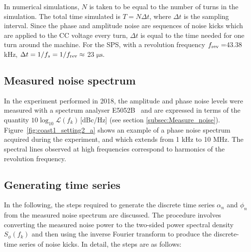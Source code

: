 In numerical simulations, $N$ is taken to be equal to the number of turns in the simulation. The total time simulated is $T=N \Delta t$, where $\Delta t$ is the sampling interval. Since the phase and amplitude noise are sequences of noise kicks which are applied to the CC voltage every turn, $\Delta t$ is equal to the time needed for one turn around the machine. For the SPS, with a revolution frequency ${f_\mathrm{rev}} = $43.38 kHz, $\Delta t=1/f_s = 1/{f_\mathrm{rev}} \approx$ 23 $\mathrm{\mu s}$. 
\subsection{Measured noise spectrum}
In the experiment performed in 2018, the amplitude and phase noise levels were measured with a spectrum analyser E5052B~\cite{E5052B_insight} and are expressed in terms of the quantity $10\log_{10}\mathcal{L}(f_k)$\,[dBc/Hz] (see section \ref{subsec:Measure_noise}). Figure~\ref{fig:coast1_setting2_a} shows an example of a phase noise spectrum acquired during the experiment, and which extends from 1 kHz to 10 MHz. The spectral lines observed at high frequencies correspond to harmonics of the revolution frequency. 

\subsection{Generating time series}\label{subsec:generatin_noise_kicks}
In the following, the steps required to generate the discrete time series $\alpha_n$ and $\phi_n$ from the measured noise spectrum are discussed. The procedure involves converting the measured noise power to the two-sided power spectral density $S_\phi(f_k)$ and then using the inverse Fourier transform to produce the discrete-time series of noise kicks. In detail, the steps are as follows:

